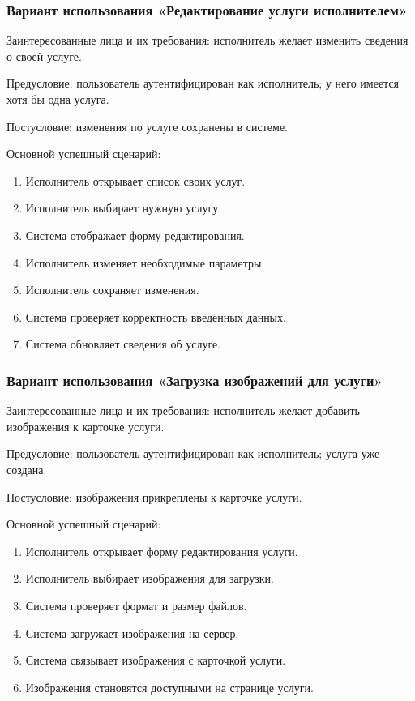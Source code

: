 \subsubsection{Вариант использования «Редактирование услуги исполнителем»}

Заинтересованные лица и их требования: исполнитель желает изменить сведения о своей услуге.

Предусловие: пользователь аутентифицирован как исполнитель; у него имеется хотя бы одна услуга.

Постусловие: изменения по услуге сохранены в системе.

Основной успешный сценарий:
\begin{enumerate}
	\item Исполнитель открывает список своих услуг.
	\item Исполнитель выбирает нужную услугу.
	\item Система отображает форму редактирования.
	\item Исполнитель изменяет необходимые параметры.
	\item Исполнитель сохраняет изменения.
	\item Система проверяет корректность введённых данных.
	\item Система обновляет сведения об услуге.
\end{enumerate}

\subsubsection{Вариант использования «Загрузка изображений для услуги»}

Заинтересованные лица и их требования: исполнитель желает добавить изображения к карточке услуги.

Предусловие: пользователь аутентифицирован как исполнитель; услуга уже создана.

Постусловие: изображения прикреплены к карточке услуги.

Основной успешный сценарий:
\begin{enumerate}
	\item Исполнитель открывает форму редактирования услуги.
	\item Исполнитель выбирает изображения для загрузки.
	\item Система проверяет формат и размер файлов.
	\item Система загружает изображения на сервер.
	\item Система связывает изображения с карточкой услуги.
	\item Изображения становятся доступными на странице услуги.
\end{enumerate}

